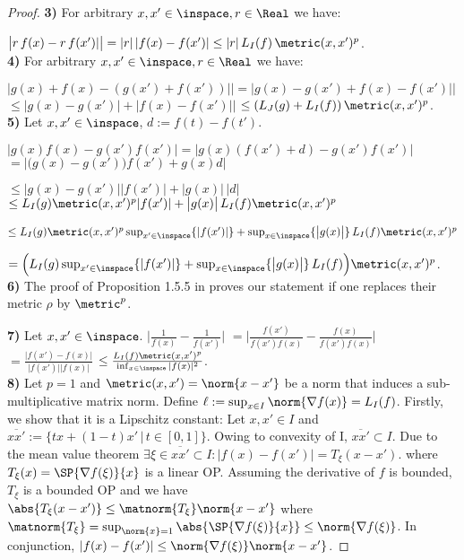 \begin{lem}
\begin{proof}
\textbf{3)}  For arbitrary $x,x' \in \inspace , r \in \Real$ we have:

$\bigl| r \, f(x) - r \, f(x')| \bigr| = |r|\, |f(x) - f(x')| \leq |r| \,L_I(f)\,  \metric(x,x')^{p}$.\\ 

\textbf{4)}  For arbitrary $x,x' \in \inspace , r \in \Real$ we have:

$\bigl| g(x) + f(x) - (g(x') + f(x'))| \bigr| = \bigl| g(x)  - g(x') + f(x)- f(x')| \bigr|$ 
$\leq \bigl| g(x)  - g(x')\bigr|  + \bigl| f(x)- f(x')| \bigr|$ $\leq (L_J(g)+L_I(f))\,  \metric(x,x')^{p}$.\\

\textbf{5)}  Let  $x,x' \in \inspace $, $d := f(t) - f(t')$.

$\bigl| g(x) f(x) - g(x')  f(x') \bigr| = \bigl| g(x) (f(x') +d) - g(x') f(x') \bigr|$ 
$= \bigl|\bigl( g(x) - g(x') \bigl)  f(x')+ g(x)  d \bigr|  $

$\leq \bigl| g(x) - g(x') \bigr|  |f(x')|   + \bigl|g(x)\bigr| \,  |d|  $
$\leq L_I(g) \metric(x,x')^p  |f(x')|   + \bigl|g(x)\bigr| \,  L_I(f) \metric(x,x')^p  $

$\leq L_I(g) \metric(x,x')^p  \sup_{x' \in \inspace } \{|f(x')|\}  \\ + \sup_{x \in \inspace }\{\bigl|g(x)\bigr|\} \,  L_I(f) \metric(x,x')^p  $

$= \Bigl(L_I(g)  \sup_{x' \in \inspace } \{|f(x')|\}   \\+ \sup_{x \in \inspace }\{\bigl|g(x)\bigr|\} \,  L_I(f)\Bigl) \metric(x,x')^p  $.\\

\textbf{6)}  The proof of Proposition 1.5.5 in \cite{Weaver1999} proves our statement if one replaces their 
metric $\rho$ by $\metric^p$.

\textbf{7)}  Let  $x,x' \in \inspace $.
$\bigl| \frac{1}{f(x)} - \frac{1}{f(x')} \bigr|$ 
$=\bigl| \frac{f(x')}{f(x') f(x)} -\frac{f(x)}{f(x') f(x)} \bigr|$ 
$= \frac{\bigl|f(x')-f(x) \bigr|}{\bigl|f(x')\bigr| \bigr| f(x)\bigr|}$ 
$\leq \frac{L_I(f) \metric(x,x')^p}{\inf_{x \in \inspace } |f(x)|^2}$.\\

\textbf{8)} Let $p=1$ and $\metric(x,x') = \norm{x-x'}$ be a norm that induces a sub-multiplicative matrix norm. Define $\ell := \sup_{x \in I } \norm{ \nabla f(x) } = L_I(f)$. 
Firstly, we show that it is a Lipschitz constant: Let $x,x' \in I $ and 
$\overline{xx'} := \{tx + (1-t) x' \, | \, t \in [0,1]\}$. 
Owing to convexity of I, $\overline{xx'} \subset I$. Due to the mean value theorem $\exists \xi \in \overline{xx'} \subset I: |f(x) - f(x')|=  T_\xi (x-x')$. where $T_\xi (x) = \SP{\nabla f(\xi)}{ x}$ is a linear OP. Assuming the derivative of $f$ is bounded, $T_\xi$ is a bounded OP and we have $\abs{T_\xi (x-x') } \leq \matnorm{T_\xi} \norm{x-x'}$ where 
$\matnorm{T_\xi} = \sup_{\norm{x} = 1} \abs{\SP{\nabla f(\xi)}{x}} \leq \norm{\nabla f(\xi)}$. In conjunction,
$|f(x) - f(x')| \leq \norm{\nabla f(\xi)} \norm{x-x'}$. 


\end{proof}
\end{lem}
